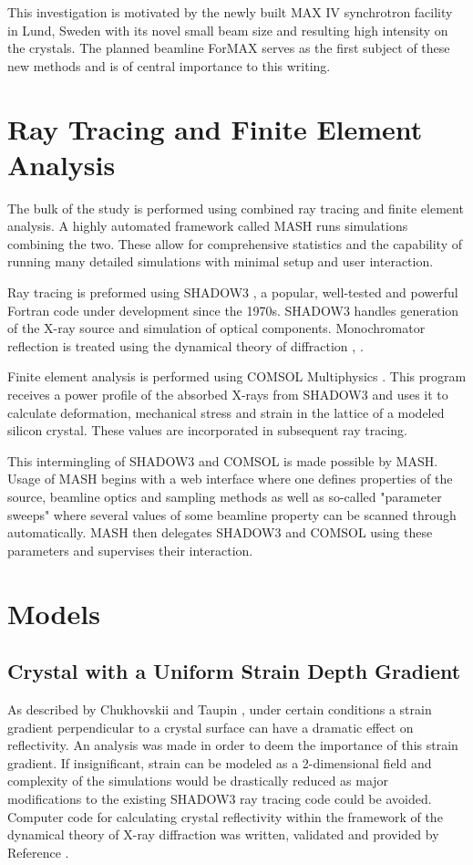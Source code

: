 \documentclass[preprint]{iucr}              %
\begin{document}
This investigation is motivated by the newly built MAX IV synchrotron facility in Lund, Sweden with its novel small beam size and resulting high intensity on the crystals. The planned beamline ForMAX \cite{formax} serves as the first subject of these new methods and is of central importance to this writing.
\section{Ray Tracing and Finite Element Analysis}

The bulk of the study is performed using combined ray tracing and finite element analysis. A highly automated framework called MASH \cite{mash} runs simulations combining the two. These allow for comprehensive statistics and the capability of running many detailed simulations with minimal setup and user interaction.

Ray tracing is preformed using SHADOW3 \cite{shadow3}, a popular, well-tested and powerful Fortran code under development since the 1970s. SHADOW3 handles generation of the X-ray source and simulation of optical components. Monochromator reflection is treated using the dynamical theory of diffraction \cite{dynamicaltheory}, \cite{asymmetricdiffraction}.

Finite element analysis is performed using COMSOL Multiphysics \cite{comsol}. This program receives a power profile of the absorbed X-rays from SHADOW3 and uses it to calculate deformation, mechanical stress and strain in the lattice of a modeled silicon crystal. These values are incorporated in subsequent ray tracing.

This intermingling of SHADOW3 and COMSOL is made possible by MASH. Usage of MASH begins with a web interface where one defines properties of the source, beamline optics and sampling methods as well as so-called "parameter sweeps" where several values of some beamline property can be scanned through automatically. MASH then delegates SHADOW3 and COMSOL using these parameters and supervises their interaction.
\section{Models}

\subsection{Crystal with a Uniform Strain Depth Gradient}\label{strain_gradient} 
As described by Chukhovskii \cite{Chukhovskii} and Taupin \cite{Taupin}, under certain conditions a strain gradient perpendicular to a crystal surface can have a dramatic effect on reflectivity. An analysis was made in order to deem the importance of this strain gradient. If insignificant, strain can be modeled as a 2-dimensional field and complexity of the simulations would be drastically reduced as major modifications to the existing SHADOW3 ray tracing code could be avoided. Computer code for calculating crystal reflectivity within the framework of the dynamical theory of X-ray diffraction was written, validated and provided by Reference \cite{coins}.
\end{document}

